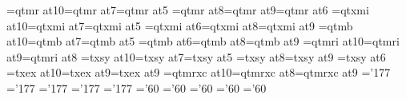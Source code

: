 \ifx\PT\undefined{}\fi
\font\tenrm=qtmr at10\PT \font\sevenrm=qtmr at7\PT \font\fiverm=qtmr at5\PT
\font\eightrm=qtmr at8\PT \font\ninerm=qtmr at9\PT \font\sixrm=qtmr at6\PT
\font\teni=qtxmi at10\PT \font\seveni=qtxmi at7\PT \font\fivei=qtxmi at5\PT
\font\sixi=qtxmi at6\PT  \font\eighti=qtxmi at8\PT \font\ninei=qtxmi at9\PT
\font\tenbf=qtmb at10\PT \font\sevenbf=qtmb at7\PT \font\fivebf=qtmb at5\PT
\font\sixbf=qtmb at6\PT  \font\eightbf=qtmb at8\PT \font\ninebf=qtmb at9\PT
\font\tenit=qtmri at10\PT \font\nineit=qtmri at9\PT \font\eightit=qtmri at8\PT
\font\tensy=txsy at10\PT \font\sevensy=txsy at7\PT \font\fivesy=txsy at5\PT
\font\eightsy=txsy at8\PT \font\ninesy=txsy at9\PT
\font\sixsy=txsy at6\PT
\font\tenex=txex at10\PT \font\eightex=txex at9\PT \font\nineex=txex at9\PT
\font\tencsc=qtmrxc at10\PT \font\eightcsc=qtmrxc at8\PT \font\ninecsc=qtmrxc at9\PT
%
\skewchar\teni='177 \skewchar\ninei='177 \skewchar\eighti='177
\skewchar\seveni='177 \skewchar\fivei='177
\skewchar\tensy='60 \skewchar\ninesy='60 \skewchar\eightsy='60
\skewchar\sevensy='60 \skewchar\fivesy='60
%
\def\eightpoint{\def\rm{\fam0\eightrm}%
\textfont0\eightrm \scriptfont0=\sixrm \scriptscriptfont0=\fiverm
\textfont1\eighti  \scriptfont1=\sixi  \scriptscriptfont1=\fivei
\textfont2\eightsy \scriptfont2=\sixsy   \scriptscriptfont2=\fivesy
\textfont3\eightex \scriptfont3=\eightex \scriptscriptfont3=\eightex
\def\mit{\fam1} \def\oldstyle{\fam1\eighti} \def\cal{\fam2}%
\textfont\itfam=\eightit \def\it{\fam\itfam\eightit}%
\textfont\bffam=\eightbf \scriptfont\bffam=\sixbf\scriptscriptfont\bffam=\fivebf
\def\bf{\fam\bffam\eightbf}%
\let\sc=\eightcsc
\normalbaselineskip=10\PT%
\setbox\strutbox=\hbox{\vrule height7.6\PT depth 2.4\PT width0pt}%
\normalbaselines\rm}
\def\ninepoint{\def\rm{\fam0\ninerm}%
\textfont0=\ninerm \scriptfont0=\sixrm \scriptscriptfont0=\fiverm
\textfont1=\ninei  \scriptfont1=\sixi  \scriptscriptfont1=\fivei
\textfont2=\ninesy \scriptfont2=\sixsy  \scriptscriptfont2=\fivesy
\textfont3=\nineex \scriptfont3=\nineex \scriptscriptfont3=\nineex
\def\mit{\fam1} \def\oldstyle{\fam1\ninei} \def\cal{\fam2}%
\textfont\itfam=\nineit \def\it{\fam\itfam\nineit}%
\textfont\bffam=\ninebf \scriptfont\bffam=\sixbf \scriptscriptfont\bffam=\fivebf
\def\bf{\fam\bffam\ninebf}%
\let\sc=\ninecsc
\normalbaselineskip=11\PT%
\setbox\strutbox=\hbox{\vrule height8\PT depth3\PT width0pt}%
\normalbaselines\rm}
